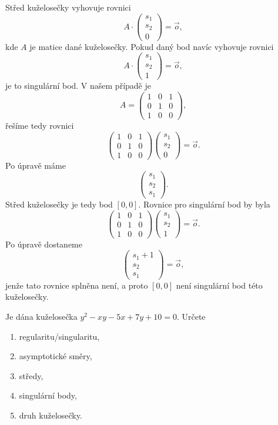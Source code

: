\begin{reseni}
Střed kuželosečky vyhovuje rovnici
$$A\cdot \begin{pmatrix}
    s_1 \\
    s_2\\
    0
\end{pmatrix}=\vec o,
$$
kde $A$ je matice dané kuželosečky. Pokud daný bod navíc vyhovuje rovnici
$$A\cdot \begin{pmatrix}
    s_1 \\
    s_2\\
    1
\end{pmatrix}=\vec o,
$$
je to singulární bod. V našem případě je
$$
    A = \begin{pmatrix}
	1 & 0 & 1\\
	0 & 1 & 0 \\
	1 & 0 & 0
    \end{pmatrix},
$$
řešíme tedy rovnici
$$
\begin{pmatrix}
	1 & 0 & 1\\
	0 & 1 & 0 \\
	1 & 0 & 0
\end{pmatrix} \begin{pmatrix}
	s_1 \\
	s_2 \\
	0
\end{pmatrix} = \vec o.
$$
Po úpravě máme
$$
\begin{pmatrix}
	s_1 \\
	s_2 \\
	s_1
\end{pmatrix}.
$$
Střed kuželosečky je tedy bod $[0,0]$. Rovnice pro singulární bod by byla
$$
\begin{pmatrix}
	1 & 0 & 1\\
	0 & 1 & 0 \\
	1 & 0 & 0
\end{pmatrix} \begin{pmatrix}
	s_1 \\
	s_2 \\
	1
\end{pmatrix} = \vec o.
$$
Po úpravě dostaneme
$$
\begin{pmatrix}
	s_1 +1\\
	s_2 \\
	s_1
\end{pmatrix} = \vec o,
$$
jenže tato rovnice splněna není, a proto $[0,0]$ není singulární bod této kuželosečky.
\end{reseni}

\begin{priklad}
Je dána kuželosečka $y^2-xy-5x+7y+10=0.$ Určete
\begin{enumerate}[$a.$]
\item regularitu/singularitu,
\item asymptotické směry,
\item středy,
\item singulární body,
\item druh kuželosečky.
\end{enumerate}
\end{priklad}


